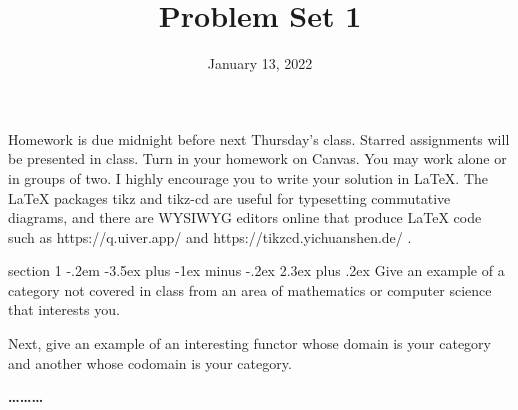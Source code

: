 \documentclass[12pt]{article}
\makeatletter
\newenvironment{problem}{\@startsection
       {section}
       {1}
       {-.2em}
       {-3.5ex plus -1ex minus -.2ex}
       {2.3ex plus .2ex}
       {\pagebreak[3]%
       \large\bf\noindent{Problem }
       }
       }
       {%
       \begin{center}\large\bf \ldots\ldots\ldots\end{center}}
\makeatother
\begin{document}
\newcommand{\skipp}{\textrm{skip}}
\newcommand{\Set}{\textrm{Set}}
\newcommand{\Cayley}{\textrm{Cayley}}
\newcommand{\Preds}{\mathcal{P}}
\newcommand{\triple}[3]{\{#1\}{#2}\{#3\}}
\newcommand{\Triple}{\textrm{Triple}}
\newcommand{\Analyse}{\textrm{Analyse}}

\title{Problem Set 1}
\date{January 13, 2022}
\maketitle

Homework is due midnight before next Thursday's class. Starred
assignments will be presented in class. Turn in your homework on
Canvas. You may work alone or in groups of two. I highly encourage you
to write your solution in LaTeX. The LaTeX packages tikz and tikz-cd
are useful for typesetting commutative diagrams, and there are WYSIWYG
editors online that produce LaTeX code such as https://q.uiver.app/
and https://tikzcd.yichuanshen.de/ .

\thispagestyle{empty}


\begin{problem}{}
  Give an example of a category not covered in class from an area of
  mathematics or computer science that interests you.

  Next, give an example of an interesting functor whose domain is your
  category and another whose codomain is your category.
\end{problem}
\end{document}
